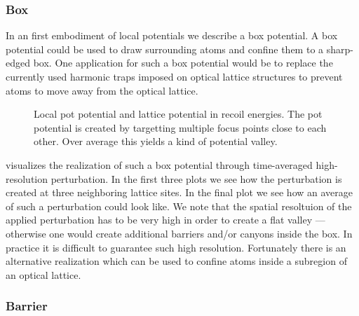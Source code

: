 \subsubsection{Box}

In an first embodiment of local potentials we describe a box potential. A box
potential could be used to draw surrounding atoms and confine them to a
sharp-edged box. One application for such a box potential would be to replace
the currently used harmonic traps imposed on optical lattice structures to
prevent atoms to move away from the optical lattice.
\begin{figure}[htb]
  \centering
  \begin{adjustbox}{width=\textwidth}
    
  \end{adjustbox}
  \caption{Local pot potential and lattice potential in recoil energies. The
    pot potential is created by targetting multiple focus points close to
    each other. Over average this yields a kind of potential valley.
  }\label{fig:effective_potential_pot}
\end{figure}
 visualizes the realization of such a box
potential through time-averaged high-resolution perturbation. In the first
three plots we see how the perturbation is created at three neighboring
lattice sites. In the final plot we see how an average of such a perturbation
could look like. We note that the spatial resoltuion of the applied
perturbation has to be very high in order to create a flat valley ---
otherwise one would create additional barriers and/or canyons inside the box.
In practice it is difficult to guarantee such high resolution. Fortunately
there is an alternative realization which can be used to confine atoms inside
a subregion of an optical lattice.

\subsubsection{Barrier}

